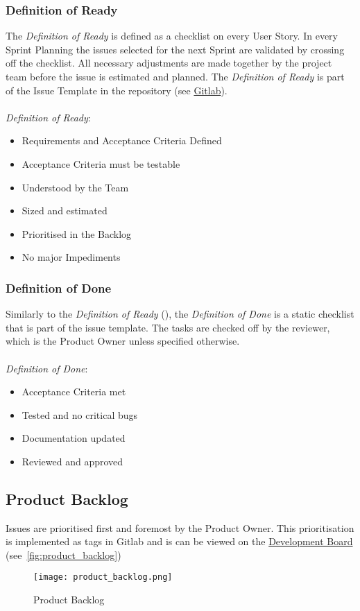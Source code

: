 \subsubsection{Definition of Ready}\label{subsubsec:dor}
The \textit{Definition of Ready} is defined as a checklist on every User Story.
In every Sprint Planning the issues selected for
the next Sprint are validated by crossing off the checklist.
All necessary adjustments are made together by the project team before the issue is
estimated and planned.
The \textit{Definition of Ready} is part of the Issue Template in the repository
(see \href{https://gitlab.ti.bfh.ch/decibel-threshold-event-displayer/decibel-threshold-event-displayer/-/blob/main/.gitlab/issue_templates/User\%20Story.md}{Gitlab}). \\ \\
\textit{Definition of Ready}:
\begin{itemize}
    \item Requirements and Acceptance Criteria Defined
    \item Acceptance Criteria must be testable
    \item Understood by the Team
    \item Sized and estimated
    \item Prioritised in the Backlog
    \item No major Impediments
\end{itemize}
\subsubsection{Definition of Done}\label{subsubsec:dod}
Similarly to the \textit{Definition of Ready} (), the \textit{Definition of Done} is a static checklist that is part of
the issue template.
The tasks are checked off by the reviewer, which is the Product Owner unless specified otherwise. \\ \\
\textit{Definition of Done}:
\begin{itemize}
    \item Acceptance Criteria met
    \item Tested and no critical bugs
    \item Documentation updated
    \item Reviewed and approved
\end{itemize}
\subsection{Product Backlog}\label{subsec:product_backlog}
Issues are prioritised first and foremost by the Product Owner.
This prioritisation is implemented as tags in Gitlab and is can be viewed
on the \href{https://gitlab.ti.bfh.ch/decibel-threshold-event-displayer/decibel-threshold-event-displayer/-/boards/2832}{Development Board} (see\ \autoref{fig:product_backlog})
\begin{figure}[H]
    \centering
    \texttt{[image: product\_backlog.png]}
    \caption{Product Backlog}\label{fig:product_backlog}
\end{figure}
